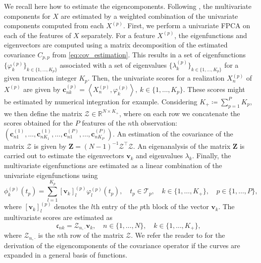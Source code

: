 \documentclass[times,sort&compress,3p]{elsarticle}
\theoremstyle{plain}%
\theoremstyle{definition}
\newcommand{\TT}[1]{\mathcal{T}_{#1}} %
\newcommand{\inLp}[2]{\left\langle#1, #2\right\rangle} %
\newcommand{\Xnp}{X_n^{(p)}} %
\begin{document}
We recall here how to estimate the eigencomponents. Following \citet[Prop.~5]{happMultivariateFunctionalPrincipal2018a}, the multivariate components for $X$ are estimated by a weighted combination of the univariate components computed from each $X^{(p)}$. First, we perform a univariate FPCA on each of the features of $X$ separately. For a feature $X^{(p)}$, the eigenfunctions and eigenvectors are computed using a matrix decomposition of the estimated covariance $C_{p, p}$ from \eqref{eq:cov_estimation}. This results in a set of eigenfunctions $\{\varphi_k^{(p)}\}_{k \in \{1, \dots, K_p\}}$ associated with a set of eigenvalues $\{\lambda_k^{(p)}\}_{k \in \{1, \dots, K_p\}}$ for a given truncation integer $K_p$. Then, the univariate scores for a realization $\Xnp$ of $X^{(p)}$ are given by $\mathbf{c}_{nk}^{(p)} = \inLp{X_n^{(p)}}{\varphi_k^{(p)}}, ~k \in \{1, \dots, K_p\}$. These scores might be estimated by numerical integration for example. Considering $K_+ \coloneqq \sum_{p = 1}^P K_p$, we then define the matrix $\mathcal{Z} \in \mathbb{R}^{N \times K_+}$, where on each row we concatenate the scores obtained for the $P$ features of the $n$th observation: 
$(\mathbf{c}_{n1}^{(1)}, \ldots, \mathbf{c}_{nK_1}^{(1)}, \ldots, \mathbf{c}_{n1}^{(P)}, \ldots, \mathbf{c}_{nK_P}^{(P)})$. An estimation of the covariance of the matrix $\mathcal{Z}$ is given by $\mathbf{Z} = (N - 1)^{-1}\mathcal{Z}^\top\mathcal{Z}$. An eigenanalysis of the matrix $\mathbf{Z}$ is carried out to estimate the eigenvectors $\boldsymbol{v}_k$ and eigenvalues $\lambda_k$. Finally, the multivariate eigenfunctions are estimated as a linear combination of the univariate eigenfunctions using
\begin{equation*}
\phi_k^{(p)}(t_p) = \sum_{l = 1}^{K_p}[\boldsymbol{v}_k]_{l}^{(p)}\varphi_{l}^{(p)}(t_p),\quad t_p \in \TT{p},\quad k \in \{1, \dots, K_+\},\quad p \in \{1, \dots, P\},
\end{equation*}
where $[\boldsymbol{v}_k]^{(p)}_{l}$ denotes the $l$th entry of the $p$th block of the vector $\boldsymbol{v}_k$. The multivariate scores are estimated as
$$\mathfrak{c}_{nk} = \mathcal{Z}_{{n,\cdot}}\boldsymbol{v}_k, \quad n \in \{1, \dots, N\}, \quad k \in \{1, \dots, K_+\},$$
where $\mathcal{Z}_{{n,\cdot}}$ is the $n$th row of the matrix $\mathcal{Z}$.
We refer the reader to \cite{happMultivariateFunctionalPrincipal2018a} for the derivation of the eigencomponents of the covariance operator if the curves are expanded in a general basis of functions.

\end{document}
